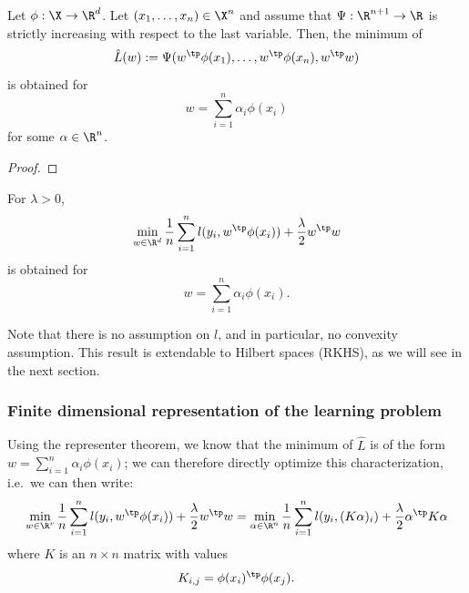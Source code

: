 \documentclass[toc]{../cs-classes/cs-classes}
\begin{document}
\begin{theorem}
    Let $\phi:\X\to\R^d$. Let $(x_1, \dots, x_n)\in\X^n$ and assume that $\Psi:\R^{n+1}\to\R$ is strictly increasing with respect to the last variable. Then, the minimum of
    \begin{equation*}
        \hat{L}(w) := \Psi(w^\tp\phi(x_1), \dots, w^\tp\phi(x_n), w^\tp w)
    \end{equation*}
    is obtained for
    \begin{equation*}
        w=\sum_{i=1}^n \alpha_i \phi(x_i)
    \end{equation*} for some $\alpha\in\R^n$.
\end{theorem}

\begin{proof}
\end{proof}

\begin{corollary}
    For $\lambda>0$, 
    \begin{equation*}
        \min_{w\in\R^d} \frac{1}{n} \sum_{i=1}^n l(y_i, w^\tp\phi(x_i)) + \frac{\lambda}{2} w^\tp w
    \end{equation*}
    is obtained for
    \begin{equation*}
        w = \sum_{i=1}^n \alpha_i\phi(x_i).
    \end{equation*}
\end{corollary}

Note that there is no assumption on $l$, and in particular, no convexity assumption. This result is extendable to Hilbert spaces (RKHS), as we will see in the next section.

\subsubsection{Finite dimensional representation of the learning problem}
Using the representer theorem, we know that the minimum of $\hat{L}$ is of the form $w=\sum_{i=1}^n \alpha_i\phi(x_i)$; we can therefore directly optimize this characterization, i.e.~we can then write:
\begin{equation*}
    \min_{w\in\R^r} \frac{1}{n} \sum_{i=1}^n l(y_i, w^\tp\phi(x_i)) + \frac{\lambda}{2} w^\tp w = \min_{\alpha\in\R^n} \frac{1}{n}\sum_{i=1}^n l(y_i, (K\alpha)_i) + \frac{\lambda}{2}\alpha^\tp K\alpha
\end{equation*}
where $K$ is an $n\times n$ matrix with values
\begin{equation*}
    K_{i, j} = \phi(x_i)^\tp \phi(x_j).
\end{equation*}
\end{document}
